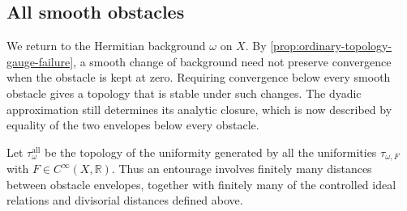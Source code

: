 \subsection{All smooth obstacles}
\label{subsec:all-obstacle-topology}

We return to the Hermitian background $\omega$ on $X$. By \cref{prop:ordinary-topology-gauge-failure}, a smooth change of background need not preserve convergence when the obstacle is kept at zero. Requiring convergence below every smooth obstacle gives a topology that is stable under such changes. The dyadic approximation still determines its analytic closure, which is now described by equality of the two envelopes below every obstacle.

Let $\tau^{\mathrm{all}}_\omega$ be the topology of the uniformity generated by all the uniformities $\tau_{\omega,F}$ with $F\in C^\infty(X,\mathbb R)$. Thus an entourage involves finitely many distances between obstacle envelopes, together with finitely many of the controlled ideal relations and divisorial distances defined above.

